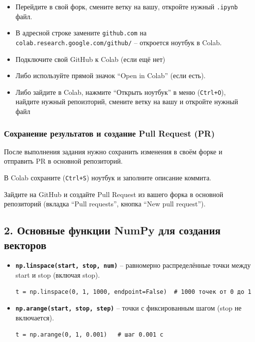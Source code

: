 \documentclass[12pt,a4paper,openany]{book}
\providecommand{\tightlist}{\setlength{\itemsep}{0pt}\setlength{\parskip}{0pt}}
\begin{document}
\begin{itemize}
\tightlist
\item
  Перейдите в свой форк, смените ветку на вашу, откройте нужный \texttt{.\allowbreak{}ipynb} файл.
\item
  В адресной строке замените \texttt{github.\allowbreak{}com} на \texttt{colab.\allowbreak{}research.\allowbreak{}google.\allowbreak{}com/\allowbreak{}github/\allowbreak{}} -- откроется ноутбук в Colab.
\item
  Подключите свой GitHub к Colab (если ещё нет)
\item
  Либо используйте прямой значок ``Open in Colab'' (если есть).
\item
  Либо зайдите в Colab, нажмите ``Открыть ноутбук'' в меню (\texttt{Ctrl+O}), найдите нужный репоизторий, смените ветку на вашу и откройте нужный файл
\end{itemize}

\subsubsection*{Сохранение результатов и создание Pull Request (PR)}

После выполнения задания нужно сохранить изменения в своём форке и отправить PR в основной репозиторий.

В Colab сохраните (\texttt{Ctrl+S}) ноутбук и заполните описание коммита.

Зайдите на GitHub и создайте Pull Request из вашего форка в основной репозиторий (вкладка ``Pull requests'', кнопка ``New pull request'').

\subsection*{2. Основные функции NumPy для создания векторов}

\begin{itemize}
\item
  \textbf{\texttt{np.\allowbreak{}linspace(\allowbreak{}start,\allowbreak{}\ stop,\allowbreak{}\ num)}} -- равномерно распределённые точки между start и stop (включая stop).

\begin{Verbatim}[fontsize=\small, breaklines, breakanywhere]
t = np.linspace(0, 1, 1000, endpoint=False)  # 1000 точек от 0 до 1
\end{Verbatim}
\item
  \textbf{\texttt{np.\allowbreak{}arange(\allowbreak{}start,\allowbreak{}\ stop,\allowbreak{}\ step)}} -- точки с фиксированным шагом (stop не включается).

\begin{Verbatim}[fontsize=\small, breaklines, breakanywhere]
t = np.arange(0, 1, 0.001)   # шаг 0.001 с
\end{Verbatim}
\end{itemize}
\end{document}
